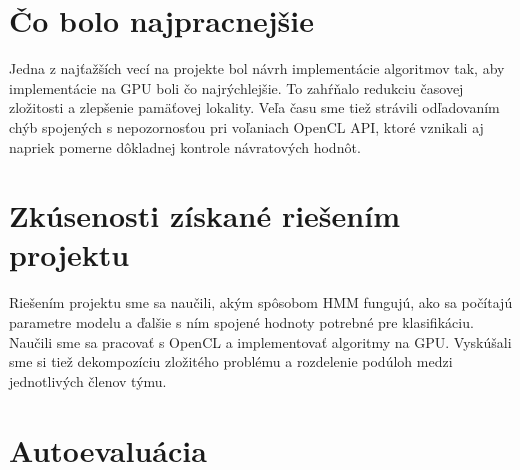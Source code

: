 \documentclass[11pt,a4paper]{article}
\begin{document}

\section{Čo bolo najpracnejšie}

Jedna z najťažších vecí na projekte bol návrh implementácie algoritmov tak, aby implementácie na GPU boli čo najrýchlejšie. To zahŕňalo redukciu časovej zložitosti a zlepšenie pamäťovej lokality. Veľa času sme tiež strávili odľadovaním chýb spojených s nepozornosťou pri voľaniach OpenCL API, ktoré vznikali aj napriek pomerne dôkladnej kontrole návratových hodnôt.


\section{Zkúsenosti získané riešením projektu}

Riešením projektu sme sa naučili, akým spôsobom HMM fungujú, ako sa počítajú parametre modelu a ďalšie s ním spojené hodnoty potrebné pre klasifikáciu. Naučili sme sa pracovať s OpenCL a implementovať algoritmy na GPU. Vyskúšali sme si tiež dekompozíciu zložitého problému a rozdelenie podúloh medzi jednotlivých členov týmu.


\section{Autoevaluácia}

\end{document}
